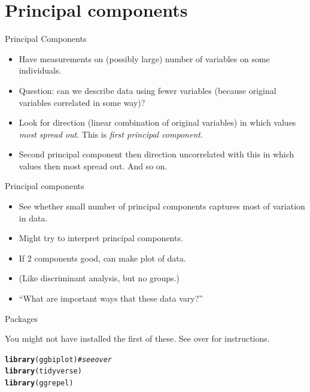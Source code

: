 \documentclass[unknownkeysallowed]{beamer}\usepackage[]{graphicx}\usepackage[]{color}
\makeatletter
\newcommand{\hlcom}[1]{\textcolor[rgb]{0.678,0.584,0.686}{\textit{#1}}}%
\newcommand{\hlstd}[1]{\textcolor[rgb]{0.345,0.345,0.345}{#1}}%
\newcommand{\hlkwd}[1]{\textcolor[rgb]{0.737,0.353,0.396}{\textbf{#1}}}%
\newenvironment{kframe}{%
 \def\at@end@of@kframe{}%
 \ifinner\ifhmode%
  \def\at@end@of@kframe{\end{minipage}}%
  \begin{minipage}{\columnwidth}%
 \fi\fi%
 \def\FrameCommand##1{\hskip\@totalleftmargin \hskip-\fboxsep
 \colorbox{shadecolor}{##1}\hskip-\fboxsep
     \hskip-\linewidth \hskip-\@totalleftmargin \hskip\columnwidth}%
 \MakeFramed {\advance\hsize-\width
   \@totalleftmargin\z@ \linewidth\hsize
   \@setminipage}}%
 {\par\unskip\endMakeFramed%
 \at@end@of@kframe}
\newenvironment{knitrout}{}{} %
\makeatother
\begin{document}
% 

\section{Principal components}
\frame{\sectionpage}

\begin{frame}[fragile]{Principal Components}
  \begin{itemize}
  \item Have measurements on (possibly large) number of variables on some individuals.
  \item Question: can we describe data using fewer variables (because original variables correlated in some way)?
  \item Look for direction (linear combination of original variables) in which values {\em most spread out}. This is {\em first principal component}.
  \item Second principal component then direction uncorrelated with this in which values then most spread out. And so on.
\end{itemize}

\end{frame}

\begin{frame}[fragile]{Principal components}
  
  \begin{itemize}
  \item See whether small number of principal components captures most of variation in data.
  \item Might try to interpret principal components.
  \item If 2 components good, can make plot of data.
  \item (Like discriminant analysis, but no groups.)
  \item ``What are important ways that these data vary?''
  \end{itemize}
  
\end{frame}

\begin{frame}[fragile]{Packages}
  
  


You might not have installed the first of these. See over for
instructions. 

\begin{knitrout}
\color{fgcolor}\begin{kframe}
\begin{alltt}
\hlkwd{library}\hlstd{(ggbiplot)} \hlcom{# see over}
\hlkwd{library}\hlstd{(tidyverse)}
\hlkwd{library}\hlstd{(ggrepel)}
\end{alltt}
\end{kframe}
\end{knitrout}
  
\end{frame}
\end{document}
